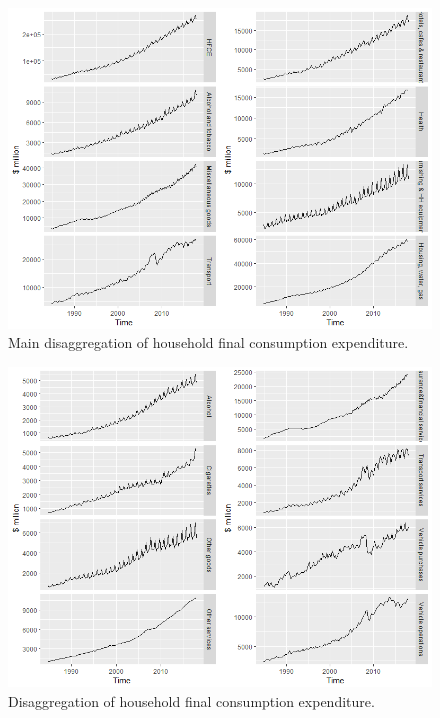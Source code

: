 \documentclass[graybox]{svmult}
\begin{document}
\begin{figure}[H]
	\centering
	\small
	\includegraphics[scale=0.5]{Figs/TS-plots/EXP-hierarchy/set-12.png}
	\caption{Main disaggregation of household final consumption expenditure.}\label{EXP-set-12}
\end{figure}

\begin{figure}[H]
	\centering
	\small
	\includegraphics[scale=0.5]{Figs/TS-plots/EXP-hierarchy/set-13.png}
	\caption{Disaggregation of household final consumption expenditure.}\label{EXP-set-13}
\end{figure}
\end{document}
